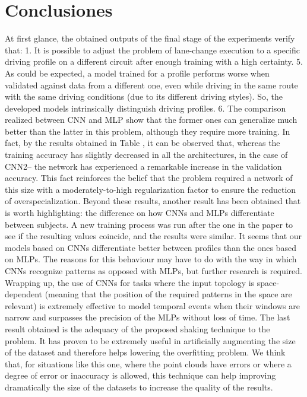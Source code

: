 \chapter{Conclusiones}
\label{ch:conclusions}





At first glance, the obtained outputs of the final stage of the experiments verify that:
1. It is possible to adjust the problem of lane-change execution to a specific driving profile on a different circuit after enough training with a high certainty.
5. As could be expected, a model trained for a profile performs worse when validated against data from a different one, even while driving in the same route with the same driving conditions (due to its different driving styles). So, the developed models intrinsically distinguish driving profiles.
6. The comparison realized between CNN and MLP show that the former ones can generalize much better than the latter in this problem, although they require more training. In fact, by the results obtained in Table , it can be observed that, whereas the training accuracy has slightly decreased in all the architectures, in the case of CNN2-- the network has experienced a remarkable increase in the validation accuracy. This fact reinforces the belief that the problem required a network of this size with a moderately-to-high regularization factor to ensure the reduction of overspecialization.
Beyond these results, another result has been obtained that is worth highlighting: the difference on how CNNs and MLPs differentiate between subjects. A new training process was run after the one in the paper to see if the resulting values coincide, and the results were similar. It seems that our models based on CNNs differentiate better between profiles than the ones based on MLPs. The reasons for this behaviour may have to do with the way in which CNNs recognize patterns as opposed with MLPs, but further research is required.
Wrapping up, the use of CNNs for tasks where the input topology is space-dependent (meaning that the position of the required patterns in the space are relevant) is extremely effective to model temporal events when their windows are narrow and surpasses the precision of the MLPs without loss of time.
The last result obtained is the adequacy of the proposed shaking technique to the problem. It has proven to be extremely useful in artificially augmenting the size of the dataset and therefore helps lowering the overfitting problem. We think that, for situations like this one, where the point clouds have errors or where a degree of error or inaccuracy is allowed, this technique can help improving dramatically the size of the datasets to increase the quality of the results.




